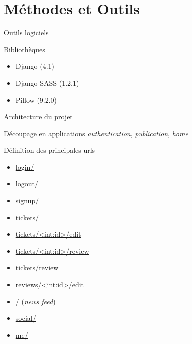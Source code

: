 \section{Méthodes et Outils}

\begin{frame}{Outils logiciels}
  \begin{block}{Bibliothèques}
    \begin{itemize}
    \item Django (4.1)
    \item Django SASS (1.2.1)
    \item Pillow (9.2.0)
    \end{itemize}
  \end{block}
\end{frame}

\begin{frame}{Architecture du projet}
  \begin{block}{Découpage en applications}
    {\color{darkred}\textit{authentication}}, 
    {\color{darkblue}\textit{publication}}, 
    {\color{darkgreen}\textit{home}}
  \end{block}
  
  \begin{block}{Définition des principales urls}
    \tiny
    \begin{itemize}
    \item {\color{darkred} \url{login/}}
    \item {\color{darkred} \url{logout/}}
    \item {\color{darkred} \url{signup/}}
    \item {\color{darkblue} \url{tickets/}}
    \item {\color{darkblue} \url{tickets/<int:id>/edit}}
    \item {\color{darkblue} \url{tickets/<int:id>/review}}
    \item {\color{darkblue} \url{tickets/review}}
    \item {\color{darkblue} \url{reviews/<int:id>/edit}}

    \item {\color{darkgreen} \url{/}} (\textit{news feed})
    \item {\color{darkgreen} \url{social/}}
    \item {\color{darkgreen} \url{me/}}
    \end{itemize}
  \end{block}
\end{frame}

